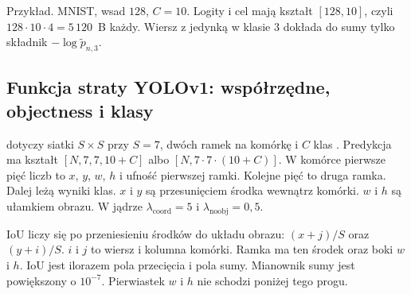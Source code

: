 Przykład. MNIST, wsad \(128\), \(C = 10\). Logity i cel mają kształt \([128, 10]\), czyli \(128 \cdot 10 \cdot 4 = 5\,120\)~B każdy. Wiersz z jedynką w klasie \(3\) dokłada do sumy tylko składnik \(-\log \tilde{p}_{n,3}\).

\subsection{Funkcja straty YOLOv1: współrzędne, objectness i klasy}

 dotyczy siatki \(S \times S\) przy \(S = 7\), dwóch ramek na komórkę i \(C\) klas \cite{redmon2016yolo}. Predykcja ma kształt \([N, 7, 7, 10+C]\) albo \([N, 7 \cdot 7 \cdot (10+C)]\). W komórce pierwsze pięć liczb to \(x\), \(y\), \(w\), \(h\) i ufność pierwszej ramki. Kolejne pięć to druga ramka. Dalej leżą wyniki klas. \(x\) i \(y\) są przesunięciem środka wewnątrz komórki. \(w\) i \(h\) są ułamkiem obrazu. W jądrze \(\lambda_{\mathrm{coord}} = 5\) i \(\lambda_{\mathrm{noobj}} = 0{,}5\).

IoU liczy się po przeniesieniu środków do układu obrazu: \((x + j)/S\) oraz \((y + i)/S\). \(i\) i \(j\) to wiersz i kolumna komórki. Ramka ma ten środek oraz boki \(w\) i \(h\). IoU jest ilorazem pola przecięcia i pola sumy. Mianownik sumy jest powiększony o \(10^{-7}\). Pierwiastek \(w\) i \(h\) nie schodzi poniżej tego progu.

